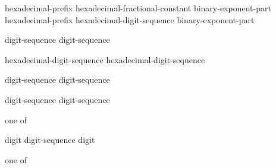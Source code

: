 \begin{bnf}
\br
    hexadecimal-prefix hexadecimal-fractional-constant binary-exponent-part \br
    hexadecimal-prefix hexadecimal-digit-sequence binary-exponent-part 
\end{bnf}

\begin{bnf}
\br
      digit-sequence\br
    digit-sequence 
\end{bnf}

\begin{bnf}
\br
      hexadecimal-digit-sequence\br
    hexadecimal-digit-sequence 
\end{bnf}

\begin{bnf}
\br
      digit-sequence\br
      digit-sequence
\end{bnf}

\begin{bnf}
\br
      digit-sequence\br
      digit-sequence
\end{bnf}

\begin{bnf}
 \textnormal{one of}\br
    \literalterminal{+  -}
\end{bnf}

\begin{bnf}
\br
    digit\br
    digit-sequence  digit
\end{bnf}

\begin{bnf}
 \textnormal{one of}\br
\end{bnf}

